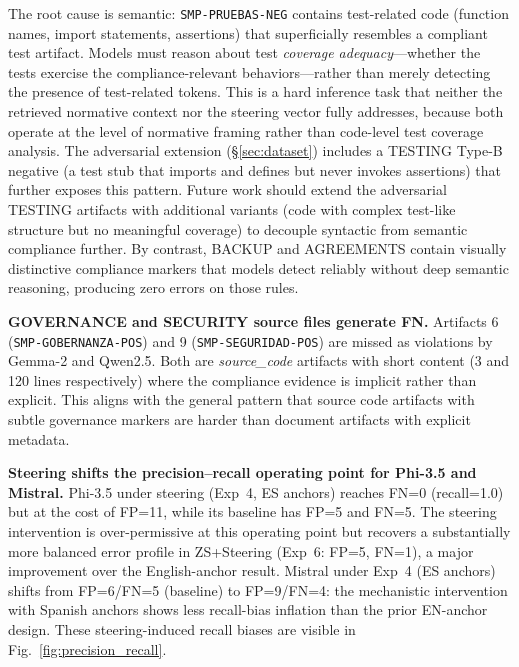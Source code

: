 \documentclass{ieeeaccess}
\begin{document}
The root cause is semantic: \texttt{SMP-PRUEBAS-NEG} contains test-related code (function names, import statements, assertions) that superficially resembles a compliant test artifact. Models must reason about test \emph{coverage adequacy}---whether the tests exercise the compliance-relevant behaviors---rather than merely detecting the presence of test-related tokens. This is a hard inference task that neither the retrieved normative context nor the steering vector fully addresses, because both operate at the level of normative framing rather than code-level test coverage analysis. The adversarial extension (§\ref{sec:dataset}) includes a TESTING Type-B negative (a test stub that imports and defines but never invokes assertions) that further exposes this pattern. Future work should extend the adversarial TESTING artifacts with additional variants (code with complex test-like structure but no meaningful coverage) to decouple syntactic from semantic compliance further. By contrast, BACKUP and AGREEMENTS contain visually distinctive compliance markers that models detect reliably without deep semantic reasoning, producing zero errors on those rules.

\textbf{GOVERNANCE and SECURITY source files generate FN.} Artifacts 6 (\texttt{SMP-GOBERNANZA-POS}) and 9 (\texttt{SMP-SEGURIDAD-POS}) are missed as violations by Gemma-2 and Qwen2.5. Both are \textit{source\_code} artifacts with short content (3 and 120 lines respectively) where the compliance evidence is implicit rather than explicit. This aligns with the general pattern that source code artifacts with subtle governance markers are harder than document artifacts with explicit metadata.

\textbf{Steering shifts the precision--recall operating point for Phi-3.5 and Mistral.} Phi-3.5 under steering (Exp~4, ES anchors) reaches FN=0 (recall=1.0) but at the cost of FP=11, while its baseline has FP=5 and FN=5. The steering intervention is over-permissive at this operating point but recovers a substantially more balanced error profile in ZS+Steering (Exp~6: FP=5, FN=1), a major improvement over the English-anchor result. Mistral under Exp~4 (ES anchors) shifts from FP=6/FN=5 (baseline) to FP=9/FN=4: the mechanistic intervention with Spanish anchors shows less recall-bias inflation than the prior EN-anchor design. These steering-induced recall biases are visible in Fig.~\ref{fig:precision_recall}.
\end{document}
